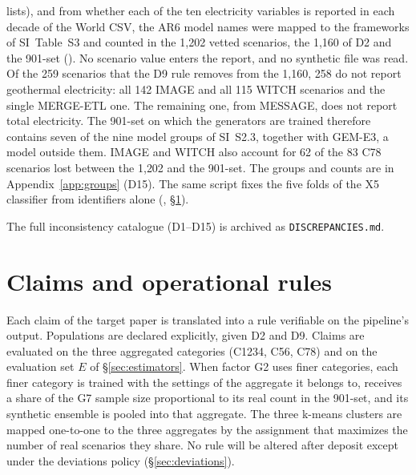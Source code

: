 \documentclass[11pt,a4paper]{article}
\newcommand{\prop}[1]{#1}
\newcommand{\prop}[1]{\textcolor{blue}{#1}}
\begin{document}
\begin{enumerate}[nosep]
{  lists), and from whether each of the ten electricity variables is
  reported in each decade of the World CSV, the AR6 model names were
  mapped to the frameworks of SI~Table~S3 and counted in the 1{,}202
  vetted scenarios, the 1{,}160 of D2 and the 901-set
  (). No scenario value enters the report,
  and no synthetic file was read. Of the 259 scenarios that the D9 rule removes from the
  1{,}160, 258 do not report geothermal electricity: all 142 IMAGE and all
  115 WITCH scenarios and the single MERGE-ETL one. The remaining one, from
  MESSAGE, does not report total electricity. The 901-set on which the
  generators are trained therefore contains seven of the nine model groups
  of SI~S2.3, together with GEM-E3, a model outside them. IMAGE and WITCH
  also account for 62 of the 83 C78 scenarios lost between the 1{,}202 and
  the 901-set. The groups and counts are in Appendix~\ref{app:groups}
  (D15). The same script fixes the five folds of the X5 classifier from
  identifiers alone (,
  \S\ref{sec:claims}).}
\end{enumerate}
The full inconsistency catalogue (D1--\prop{D15}) is archived as
\texttt{DISCREPANCIES.md}.

\section{Claims and operational rules}\label{sec:claims}
Each claim of the target paper is translated into a rule verifiable on the
pipeline's output. Populations are declared explicitly, given D2 and D9.
Claims are evaluated on the three aggregated categories (C1234, C56, C78)
and on the evaluation set $E$ of \S\ref{sec:estimators}. When factor
G2 uses finer categories, each finer category is trained with the settings
of the aggregate it belongs to, receives a share of the G7 sample size
proportional to its real count in the 901-set, and its synthetic ensemble
is pooled into that aggregate. The three k-means clusters are mapped
one-to-one to the three aggregates by the assignment that maximizes the
number of real scenarios they share. No rule
will be altered after deposit except under the deviations policy
(\S\ref{sec:deviations}).
\end{document}
